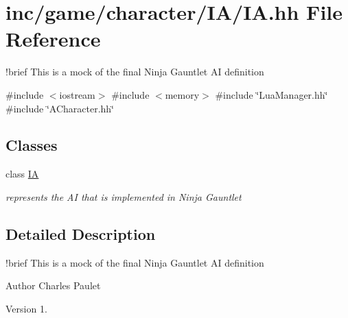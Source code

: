 \hypertarget{IA_8hh}{}\section{inc/game/character/\+I\+A/\+IA.hh File Reference}
\label{IA_8hh}


!brief This is a mock of the final Ninja Gauntlet AI definition  


{\ttfamily \#include $<$iostream$>$}\newline
{\ttfamily \#include $<$memory$>$}\newline
{\ttfamily \#include \char`\"{}Lua\+Manager.\+hh\char`\"{}}\newline
{\ttfamily \#include \char`\"{}A\+Character.\+hh\char`\"{}}\newline
\subsection*{Classes}
\begin{DoxyCompactItemize}
\item 
class \hyperlink{classIA}{IA}
\begin{DoxyCompactList}\small\item\em represents the AI that is implemented in Ninja Gauntlet \end{DoxyCompactList}\end{DoxyCompactItemize}


\subsection{Detailed Description}
!brief This is a mock of the final Ninja Gauntlet AI definition 

\begin{DoxyAuthor}{Author}
Charles Paulet 
\end{DoxyAuthor}
\begin{DoxyVersion}{Version}
1. 
\end{DoxyVersion}
